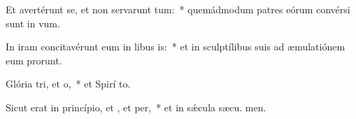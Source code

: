 \item Et avertérunt se, et non servarunt tum:~* quemádmodum patres eórum convérsi sunt in  vum.
\item In iram concitavérunt eum in libus is:~* et in sculptílibus suis ad æmulatiónem eum prorunt.
\item Glória tri, et o,~* et Spirí to.
\item Sicut erat in princípio, et , et per,~* et in sǽcula sæcu. men.
